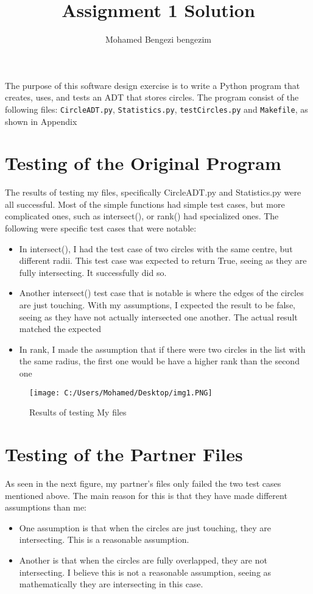 \documentclass[12pt]{article}
\title{Assignment 1 Solution}
\author{Mohamed Bengezi bengezim}
\begin{document}
\maketitle

The purpose of this software design exercise is to write a Python program that
creates, uses, and tests an ADT that stores circles.  The program consist of the
following files: {\tt CircleADT.py}, {\tt Statistics.py}, {\tt testCircles.py}
and {\tt Makefile}, as shown in Appendix



\section*{Testing of the Original Program}

The results of testing my files, specifically CircleADT.py and Statistics.py were all successful.
 Most of the simple functions had simple test cases, but more complicated ones, such as intersect(), or rank()
 had specialized ones. The following were specific test cases that were notable:
\begin{itemize}
\item In intersect(), I had the test case of two circles with the same centre, but different radii.
This test case was expected to return True, seeing as they are fully intersecting. It
successfully did so.
\item Another intersect() test case that is notable is where the edges of the circles are just touching. 
With my assumptions, I expected the result to be false, seeing as they have not actually intersected one
another. The actual result matched the expected
\item In rank, I made the assumption that if there were two circles in the list with the same radius, the 
first one would be have a higher rank than the second one

\end{itemize}


\begin{figure}
\centering
\texttt{[image: C:/Users/Mohamed/Desktop/img1.PNG]}
\caption{Results of testing My files}
\label{Figure : example}
\end{figure}


\newpage

\section*{Testing of the Partner Files}
As seen in the next figure, my partner's files only failed the two test cases mentioned above.
The main reason for this is that they have made different assumptions than me:
\begin{itemize}
\item One assumption is that when the circles are just touching, they are intersecting. This
is a reasonable assumption.
\item Another is that when the circles are fully overlapped, they are not intersecting. I believe
this is not a reasonable assumption, seeing as mathematically they are intersecting in this case.
\end{itemize}
\end{document}

